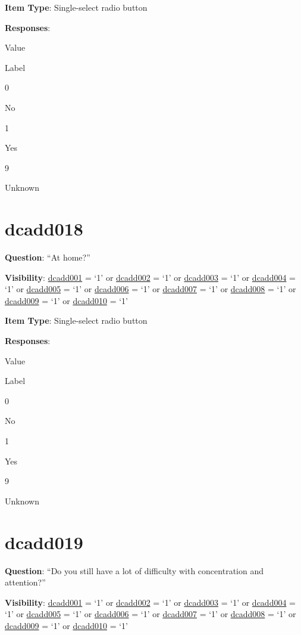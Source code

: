 \documentclass[]{book}
\begin{document}
\textbf{Item Type}: Single-select radio button

\textbf{Responses}:

Value

Label

0

No

1

Yes

9

Unknown

\hypertarget{dcadd018}{%
\section{dcadd018}\label{dcadd018}}

\textbf{Question}: ``At home?''

\textbf{Visibility}: \protect\hyperlink{dcadd001}{dcadd001} = `1' or \protect\hyperlink{dcadd002}{dcadd002} = `1' or \protect\hyperlink{dcadd003}{dcadd003} = `1' or \protect\hyperlink{dcadd004}{dcadd004} = `1' or \protect\hyperlink{dcadd005}{dcadd005} = `1' or \protect\hyperlink{dcadd006}{dcadd006} = `1' or \protect\hyperlink{dcadd007}{dcadd007} = `1' or \protect\hyperlink{dcadd008}{dcadd008} = `1' or \protect\hyperlink{dcadd009}{dcadd009} = `1' or \protect\hyperlink{dcadd010}{dcadd010} = `1'

\textbf{Item Type}: Single-select radio button

\textbf{Responses}:

Value

Label

0

No

1

Yes

9

Unknown

\hypertarget{dcadd019}{%
\section{dcadd019}\label{dcadd019}}

\textbf{Question}: ``Do you still have a lot of difficulty with concentration and attention?''

\textbf{Visibility}: \protect\hyperlink{dcadd001}{dcadd001} = `1' or \protect\hyperlink{dcadd002}{dcadd002} = `1' or \protect\hyperlink{dcadd003}{dcadd003} = `1' or \protect\hyperlink{dcadd004}{dcadd004} = `1' or \protect\hyperlink{dcadd005}{dcadd005} = `1' or \protect\hyperlink{dcadd006}{dcadd006} = `1' or \protect\hyperlink{dcadd007}{dcadd007} = `1' or \protect\hyperlink{dcadd008}{dcadd008} = `1' or \protect\hyperlink{dcadd009}{dcadd009} = `1' or \protect\hyperlink{dcadd010}{dcadd010} = `1'
\end{document}
